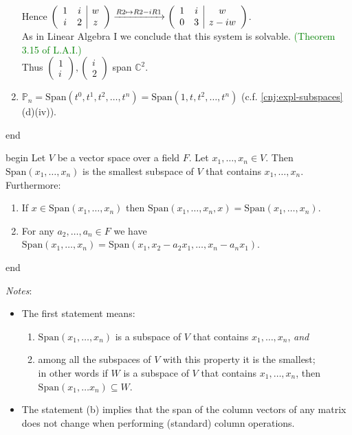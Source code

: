 \documentclass[
  12pt,
  a4paper,
  twoside]{article}
\providecommand{\tightlist}{%
  \setlength{\itemsep}{0pt}\setlength{\parskip}{0pt}}
\theoremstyle{plain}
\theoremstyle{definition}
\begin{document}
\begin{enumerate}
  Hence \(\left( \begin{array}{ c c | c } 1 & i & w \\ i & 2 & z \end{array} \right) \xrightarrow{R2 \mapsto R2 - iR1} \left( \begin{array}{ c c | c } 1 & i & w \\ 0 & 3 & z-iw \end{array} \right)\).\\
  As in Linear Algebra I we conclude that this system is solvable. \textcolor{green}{(Theorem 3.15 of L.A.I.)}\\
  Thus \(\begin{pmatrix} 1 \\ i \end{pmatrix}, \begin{pmatrix} i \\ 2 \end{pmatrix}\) span \(\mathbb{C}^2\).
\item
  \(\mathbb{P}_n = \mathrm{Span}(t^0,t^1,t^2, \dots, t^n) = \mathrm{Span}(1,t,t^2, \dots, t^n)\) (c.f. \ref{cnj:expl-subspaces}(d)(iv)).
\end{enumerate}

\csname end

\csname begin\label{cnj:prop-spans}
Let \(V\) be a vector space over a field \(F\).
Let \(x_1, \dots, x_n \in V\).
Then \(\mathrm{Span}(x_1, \dots, x_n)\) is the smallest subspace of \(V\) that contains \(x_1, \dots, x_n\).
Furthermore:

\begin{enumerate}
\def\labelenumi{(\alph{enumi})}
\item
  If \(x \in \mathrm{Span}(x_1, \dots ,x_n)\) then \(\mathrm{Span}(x_1, \dots, x_n,x) = \mathrm{Span}(x_1, \dots, x_n)\).
\item
  For any \(a_2, \dots, a_n \in F\) we have \(\mathrm{Span}(x_1, \dots, x_n) = \mathrm{Span}(x_1, x_2-a_2x_1, \dots, x_n- a_nx_1)\).
\end{enumerate}

\csname end

\emph{Notes}:

\begin{itemize}
\item
  The first statement means:

  \begin{enumerate}
  \def\labelenumi{\arabic{enumi}.}
  \tightlist
  \item
    \(\mathrm{Span}(x_1, \dots, x_n)\) is a subspace of \(V\) that contains \(x_1, \dots, x_n\), \emph{and}
  \item
    among all the subspaces of \(V\) with this property it is the smallest;\\
    in other words if \(W\) is a subspace of \(V\) that contains \(x_1, \dots, x_n\), then \(\mathrm{Span}(x_1, \dots x_n) \subseteq W\).
  \end{enumerate}
\item
  The statement (b) implies that the span of the column vectors of any matrix does not change when performing (standard) column operations.
\end{itemize}
\end{document}
